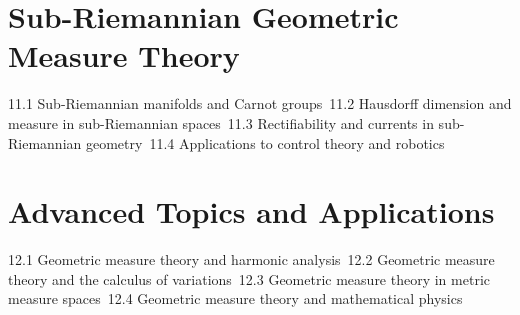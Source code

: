 \section{Sub-Riemannian Geometric Measure Theory}
11.1 Sub-Riemannian manifolds and Carnot groups\
11.2 Hausdorff dimension and measure in sub-Riemannian spaces\
11.3 Rectifiability and currents in sub-Riemannian geometry\
11.4 Applications to control theory and robotics\
\section{Advanced Topics and Applications}
12.1 Geometric measure theory and harmonic analysis\
12.2 Geometric measure theory and the calculus of variations\
12.3 Geometric measure theory in metric measure spaces\
12.4 Geometric measure theory and mathematical physics\
